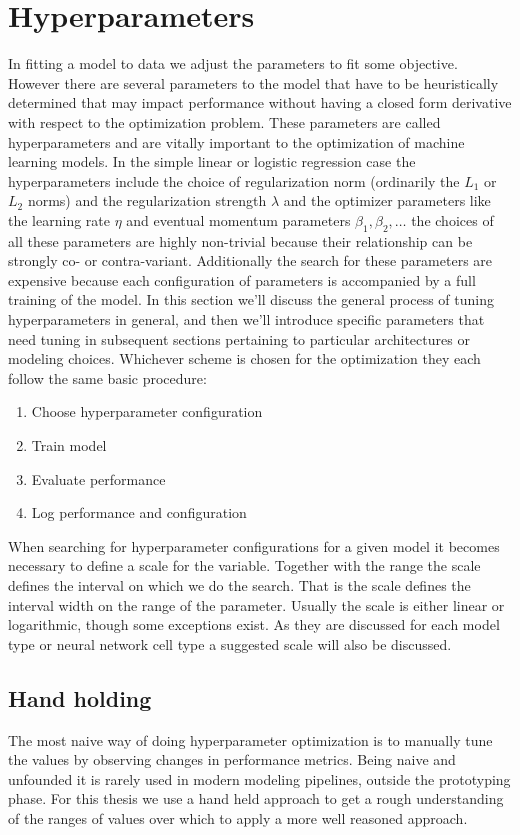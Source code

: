 \section{Hyperparameters}\label{sec:hyperparams}

In fitting a model to data we adjust the parameters to fit some objective. However there are several parameters to the model that have to be heuristically determined that may impact performance without having a closed form derivative with respect to the optimization problem. These parameters are called hyperparameters and are vitally important to the optimization of machine learning models. In the simple linear or logistic regression case the hyperparameters include the choice of regularization norm (ordinarily the $L_1$ or $L_2$ norms) and the regularization strength $\lambda$ and the optimizer parameters like the learning rate $\eta$ and eventual momentum parameters $\beta_1, \beta_2, \dots$ the choices of all these parameters are highly non-trivial because their relationship can be strongly co- or contra-variant. Additionally the search for these parameters are expensive because each configuration of parameters is accompanied by a full training of the model. In this section we'll discuss the general process of tuning hyperparameters in general, and then we'll introduce specific parameters that need tuning in subsequent sections pertaining to particular architectures or modeling choices. Whichever scheme is chosen for the optimization they each follow the same basic procedure:

\begin{enumerate}
\item Choose hyperparameter configuration
\item Train model
\item Evaluate performance
\item Log performance and configuration
\end{enumerate}

\noindent When searching for hyperparameter configurations for a given model it becomes necessary to define a scale for the variable. Together with the range the scale defines the interval on which we do the search. That is the scale defines the interval width on the range of the parameter. Usually the scale is either linear or logarithmic, though some exceptions exist. As they are discussed for each model type or neural network cell type a suggested scale will also be discussed.

\subsection{Hand holding}
The most naive way of doing hyperparameter optimization is to manually tune the values by observing changes in performance metrics. Being naive and unfounded it is rarely used in modern modeling pipelines, outside the prototyping phase. For this thesis we use a hand held approach to get a rough understanding of the ranges of values over which to apply a more well reasoned approach. 


